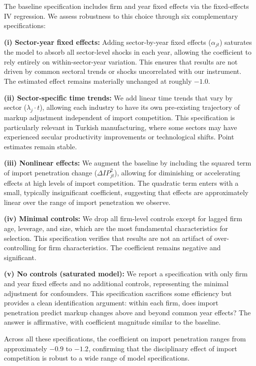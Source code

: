 \documentclass[12pt]{article}
\begin{document}
The baseline specification includes firm and year fixed effects via the fixed-effects IV regression. We assess robustness to this choice through six complementary specifications:

\textbf{(i) Sector-year fixed effects:} Adding sector-by-year fixed effects ($\alpha_{jt}$) saturates the model to absorb all sector-level shocks in each year, allowing the coefficient to rely entirely on within-sector-year variation. This ensures that results are not driven by common sectoral trends or shocks uncorrelated with our instrument. The estimated effect remains materially unchanged at roughly $-1.0$.

\textbf{(ii) Sector-specific time trends:} We add linear time trends that vary by sector ($\lambda_j \cdot t$), allowing each industry to have its own pre-existing trajectory of markup adjustment independent of import competition. This specification is particularly relevant in Turkish manufacturing, where some sectors may have experienced secular productivity improvements or technological shifts. Point estimates remain stable.

\textbf{(iii) Nonlinear effects:} We augment the baseline by including the squared term of import penetration change ($\Delta IP_{jt}^2$), allowing for diminishing or accelerating effects at high levels of import competition. The quadratic term enters with a small, typically insignificant coefficient, suggesting that effects are approximately linear over the range of import penetration we observe.

\textbf{(iv) Minimal controls:} We drop all firm-level controls except for lagged firm age, leverage, and size, which are the most fundamental characteristics for selection. This specification verifies that results are not an artifact of over-controlling for firm characteristics. The coefficient remains negative and significant.

\textbf{(v) No controls (saturated model):} We report a specification with only firm and year fixed effects and no additional controls, representing the minimal adjustment for confounders. This specification sacrifices some efficiency but provides a clean identification argument: within each firm, does import penetration predict markup changes above and beyond common year effects? The answer is affirmative, with coefficient magnitude similar to the baseline.

Across all these specifications, the coefficient on import penetration ranges from approximately $-0.9$ to $-1.2$, confirming that the disciplinary effect of import competition is robust to a wide range of model specifications.
\end{document}
